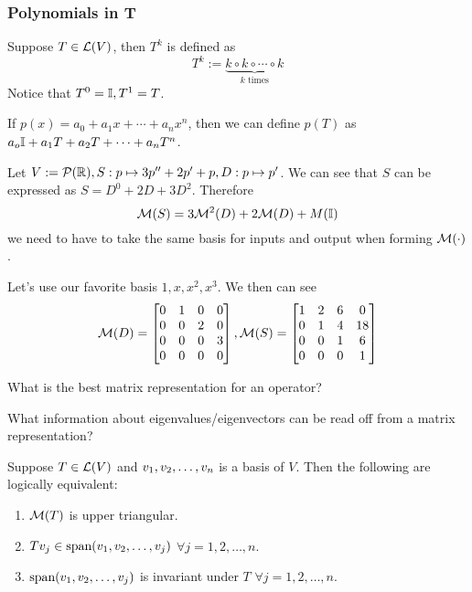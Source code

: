 \subsubsection{Polynomials in T}
\begin{definition}
    Suppose $T \in \mathcal L(V)$, then $T^k$ is defined as
    \[ T^k := \underbrace{k \circ k \circ \cdots \circ k}_{k \text{ times}}\]
    Notice that $T^0 = \mathbb I, T^1 = T$.
\end{definition}
\begin{definition}
    If $p(x) = a_0 + a_1x + \cdots + a_nx^n$, then we can define $p(T)$ as $a_o\mathbb I + a_1T + a_2T + \cdots + a_nT^n$.
\end{definition}
\begin{example}
    Let $V := \mathcal P(\mathbb R), S: p \mapsto 3p'' +  2p' + p, D: p \mapsto p'$. We can see that $S$ can be expressed as $S = D^0 + 2D + 3D^2$. Therefore \[\mathcal M(S) = 3\mathcal M^2(D) + 2\mathcal M(D) + M(\mathbb I)\] we need to have to take the same basis for inputs and output when forming $\mathcal M(\cdot)$.  
    
    \noindent Let's use our favorite basis $1,x,x^2, x^3$. We then can see
    \[ \mathcal M(D) = \begin{bmatrix} 0 & 1 & 0 & 0 \\ 0 & 0 & 2 & 0 \\ 0 & 0 & 0 & 3 \\ 0 & 0 & 0 & 0 \end{bmatrix}, \mathcal M(S) = \begin{bmatrix} 1 & 2 & 6 & 0\\ 0 & 1 & 4 & 18\\ 0 & 0 & 1 & 6 \\ 0 & 0 & 0 & 1 \end{bmatrix}\]
\end{example}
\begin{question}
    What is the best matrix representation for an operator?
\end{question}
\begin{question}
    What information about eigenvalues/eigenvectors can be read off from a matrix representation?
\end{question}
\begin{theorem}
    Suppose $T \in \mathcal L(V)$ and ${v}_1,{v}_2, \ldots, {v}_{n}$ is a basis of $V$. Then the following are logically equivalent:
    \begin{enumerate}
        \item  $\mathcal M(T)$ is upper triangular.
        \item $Tv_j \in \text{span} ({v}_1,{v}_2, \ldots, {v}_{j})$ $\forall j = 1,2, \ldots, n$.
        \item $\text{span} ({v}_1,{v}_2, \ldots, {v}_{j})$ is invariant under $T$ $\forall j = 1,2,\ldots, n$.
    \end{enumerate}
\end{theorem}
